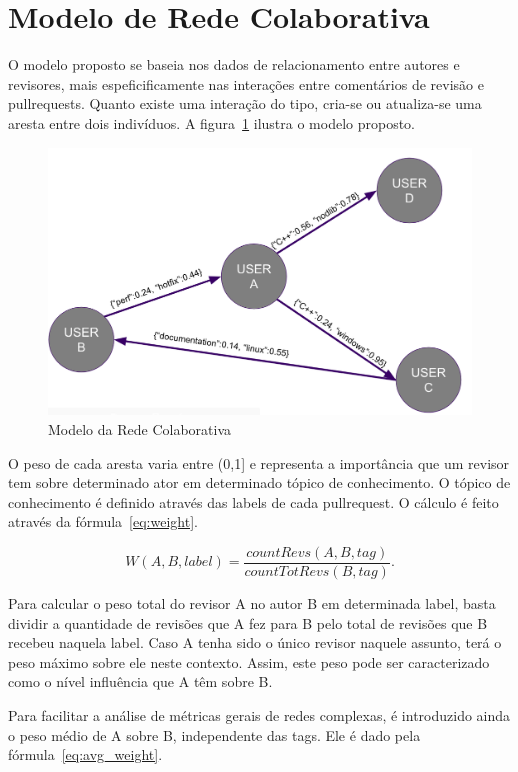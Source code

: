 \documentclass[a4paper,12pt]{monografia}
\theoremstyle{plain}
\theoremstyle{definition}
\theoremstyle{remark}
\begin{document}
\section{Modelo de Rede Colaborativa}

O modelo proposto se baseia nos dados de relacionamento entre autores e revisores, mais espeficificamente nas interações entre comentários de revisão e pullrequests. Quanto existe uma interação do tipo, cria-se ou atualiza-se uma aresta entre dois indivíduos. A figura~\ref{fig:ger} ilustra o modelo proposto.

\begin{figure}[!htbp]
 \includegraphics[width=\textwidth]{ger}
 \caption{Modelo da Rede Colaborativa}\label{fig:ger}
\end{figure}

O peso de cada aresta varia entre (0,1] e representa a importância que um revisor tem sobre determinado ator em determinado tópico de conhecimento. O tópico de conhecimento é definido através das labels de cada pullrequest. O cálculo é feito através da fórmula~\ref{eq:weight}.

\begin{equation}\label{eq:weight}
	W(A,B,label) = \dfrac{countRevs(A,B,tag)}{countTotRevs(B, tag)}.
\end{equation}

Para calcular o peso total do revisor A no autor B em determinada label, basta dividir a quantidade de revisões que A fez para B pelo total de revisões que B recebeu naquela label. Caso A tenha sido o único revisor naquele assunto, terá o peso máximo sobre ele neste contexto. Assim, este peso pode ser caracterizado como o nível influência que A têm sobre B.

Para facilitar a análise de métricas gerais de redes complexas, é introduzido ainda o peso médio de A sobre B, independente das tags. Ele é dado pela fórmula~\ref{eq:avg_weight}.
\end{document}
